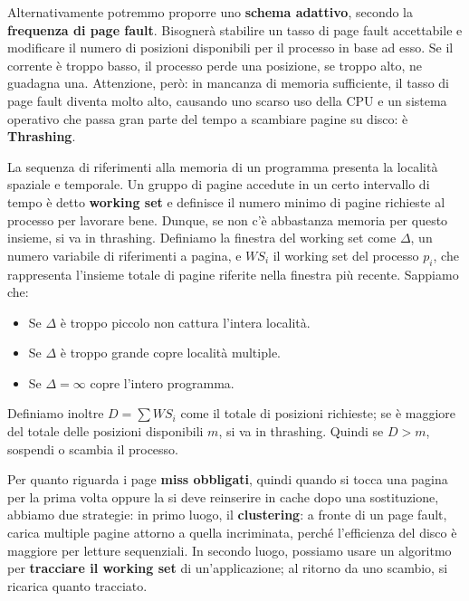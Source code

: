 \noindent Alternativamente potremmo proporre uno \textbf{schema adattivo}, secondo la \textbf{frequenza di page fault}. Bisognerà stabilire un tasso di
page fault accettabile e modificare il numero di posizioni disponibili per il processo in base ad esso. Se il corrente è troppo basso, il processo
perde una posizione, se troppo alto, ne guadagna una. Attenzione, però: in mancanza di memoria sufficiente, il tasso di page fault diventa molto alto,
causando uno scarso uso della CPU e un sistema operativo che passa gran parte del tempo a scambiare pagine su disco: è \textbf{Thrashing}.\par
La sequenza di riferimenti alla memoria di un programma presenta la località spaziale e temporale. Un gruppo di pagine accedute in un certo intervallo
di tempo è detto \textbf{working set} e definisce il numero minimo di pagine richieste al processo per lavorare bene. Dunque, se non c'è abbastanza
memoria per questo insieme, si va in thrashing. Definiamo la finestra del working set come $\Delta$, un numero variabile di riferimenti a pagina, e
$WS_i$ il working set del processo $p_i$, che rappresenta l'insieme totale di pagine riferite nella finestra più recente. Sappiamo che: \begin{itemize}
    \item Se $\Delta$ è troppo piccolo non cattura l'intera località.
    \item Se $\Delta$ è troppo grande copre località multiple.
    \item Se $\Delta = \infty$ copre l'intero programma.
\end{itemize}

\noindent Definiamo inoltre $D = \sum WS_i$ come il totale di posizioni richieste; se è maggiore del totale delle posizioni disponibili $m$, si va in
thrashing. Quindi se $D > m$, sospendi o scambia il processo.\par
Per quanto riguarda i page \textbf{miss obbligati}, quindi quando si tocca una pagina per la prima volta oppure la si deve reinserire in cache dopo una
sostituzione, abbiamo due strategie: in primo luogo, il \textbf{clustering}: a fronte di un page fault, carica multiple pagine attorno a quella
incriminata, perché l'efficienza del disco è maggiore per letture sequenziali. In secondo luogo, possiamo usare un algoritmo per \textbf{tracciare il
working set} di un'applicazione; al ritorno da uno scambio, si ricarica quanto tracciato.